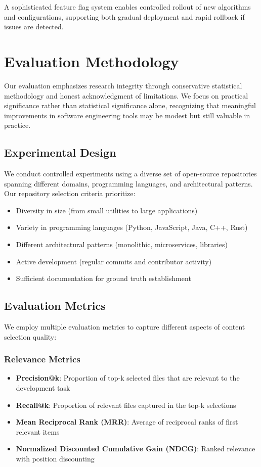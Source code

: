 \documentclass[conference]{IEEEtran}
\begin{document}
A sophisticated feature flag system enables controlled rollout of new algorithms and configurations, supporting both gradual deployment and rapid rollback if issues are detected.

\section{Evaluation Methodology}

Our evaluation emphasizes research integrity through conservative statistical methodology and honest acknowledgment of limitations. We focus on practical significance rather than statistical significance alone, recognizing that meaningful improvements in software engineering tools may be modest but still valuable in practice.

\subsection{Experimental Design}

We conduct controlled experiments using a diverse set of open-source repositories spanning different domains, programming languages, and architectural patterns. Our repository selection criteria prioritize:

\begin{itemize}
\item Diversity in size (from small utilities to large applications)
\item Variety in programming languages (Python, JavaScript, Java, C++, Rust)
\item Different architectural patterns (monolithic, microservices, libraries)
\item Active development (regular commits and contributor activity)
\item Sufficient documentation for ground truth establishment
\end{itemize}

\subsection{Evaluation Metrics}

We employ multiple evaluation metrics to capture different aspects of content selection quality:

\subsubsection{Relevance Metrics}
\begin{itemize}
\item \textbf{Precision@k}: Proportion of top-k selected files that are relevant to the development task
\item \textbf{Recall@k}: Proportion of relevant files captured in the top-k selections
\item \textbf{Mean Reciprocal Rank (MRR)}: Average of reciprocal ranks of first relevant items
\item \textbf{Normalized Discounted Cumulative Gain (NDCG)}: Ranked relevance with position discounting
\end{itemize}
\end{document}

